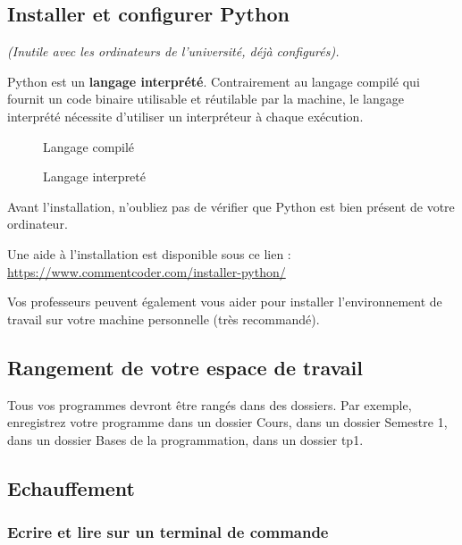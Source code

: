 

\subsection{Installer et configurer Python}
\textit{(Inutile avec les ordinateurs de l'université, déjà configurés).}


Python est un \textbf{langage interprété}. Contrairement au langage compilé qui fournit un code binaire utilisable et réutilable par la machine, le langage interprété nécessite d'utiliser un interpréteur à chaque exécution.


\begin{figure}[H]
\begin{minipage}[b]{0.4\textwidth}

    
\caption{Langage compilé}

\end{minipage}\hfill
\begin{minipage}[b]{0.4\textwidth}

    \caption{Langage interpreté}
    \label{fig:com}
\end{minipage}
\end{figure}


Avant l'installation, n'oubliez pas de vérifier que Python est bien présent de votre ordinateur.


Une aide à l'installation est disponible sous ce lien :
\url{https://www.commentcoder.com/installer-python/}

Vos professeurs peuvent également vous aider pour installer l'environnement de travail sur votre machine personnelle (très recommandé).

\subsection{Rangement de votre espace de travail}
Tous vos programmes devront être rangés dans des dossiers.
Par exemple, enregistrez votre programme dans un dossier Cours, dans un dossier Semestre 1, dans un dossier Bases de la programmation, dans un dossier tp1.

\subsection{Echauffement}



\subsubsection{Ecrire et lire sur un terminal de commande}


